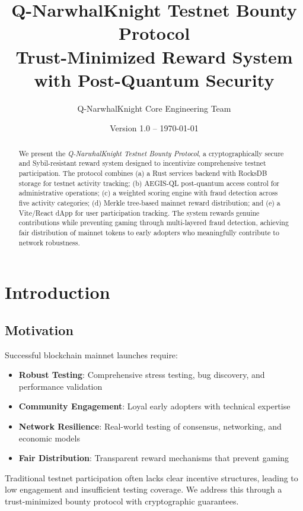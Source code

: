 \documentclass[11pt,a4paper]{article}
\title{\textbf{Q-NarwhalKnight Testnet Bounty Protocol} \\
\large Trust-Minimized Reward System with Post-Quantum Security}
\author{Q-NarwhalKnight Core Engineering Team}
\date{Version 1.0 -- \today}
\begin{document}
\maketitle

\begin{abstract}
We present the \textit{Q-NarwhalKnight Testnet Bounty Protocol}, a cryptographically secure and Sybil-resistant reward system designed to incentivize comprehensive testnet participation. The protocol combines (a) a Rust services backend with RocksDB storage for testnet activity tracking; (b) AEGIS-QL post-quantum access control for administrative operations; (c) a weighted scoring engine with fraud detection across five activity categories; (d) Merkle tree-based mainnet reward distribution; and (e) a Vite/React dApp for user participation tracking. The system rewards genuine contributions while preventing gaming through multi-layered fraud detection, achieving fair distribution of mainnet tokens to early adopters who meaningfully contribute to network robustness.
\end{abstract}

\tableofcontents
\newpage

\section{Introduction}

\subsection{Motivation}
Successful blockchain mainnet launches require:
\begin{itemize}
    \item \textbf{Robust Testing}: Comprehensive stress testing, bug discovery, and performance validation
    \item \textbf{Community Engagement}: Loyal early adopters with technical expertise
    \item \textbf{Network Resilience}: Real-world testing of consensus, networking, and economic models
    \item \textbf{Fair Distribution}: Transparent reward mechanisms that prevent gaming
\end{itemize}

Traditional testnet participation often lacks clear incentive structures, leading to low engagement and insufficient testing coverage. We address this through a trust-minimized bounty protocol with cryptographic guarantees.
\end{document}

